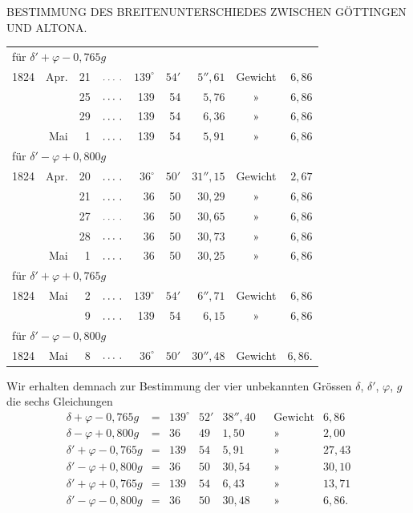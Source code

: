 \clearpage
\noindent{}\parbox[t]{\dimexpr\textwidth-10mm\relax}{\centering\scriptsize BESTIMMUNG DES BREITENUNTERSCHIEDES ZWISCHEN GÖTTINGEN UND ALTONA.}\par
\begin{center}
\begin{tabular}{rrrc rr r c r}
\multicolumn{9}{l}{für $\delta'+\varphi-0{,}765g$}\\
1824&Apr.&21&$\ldots\,\ldotp$&$139^\circ$&$54'$&$5''{,}61$&Gewicht&$6{,}86$\\
&&25&$\ldots\,\ldotp$&139&54&$5{,}76$&»&$6{,}86$\\
&&29&$\ldots\,\ldotp$&139&54&$6{,}36$&»&$6{,}86$\\
&Mai&1&$\ldots\,\ldotp$&139&54&$5{,}91$&»&$6{,}86$\\
\multicolumn{9}{l}{für $\delta'-\varphi+0{,}800g$}\\
1824&Apr.&20&$\ldots\,\ldotp$&$36^\circ$&$50'$&$31''{,}15$&Gewicht&$2{,}67$\\
&&21&$\ldots\,\ldotp$&36&50&$30{,}29$&»&$6{,}86$\\
&&27&$\ldots\,\ldotp$&36&50&$30{,}65$&»&$6{,}86$\\
&&28&$\ldots\,\ldotp$&36&50&$30{,}73$&»&$6{,}86$\\
&Mai&1&$\ldots\,\ldotp$&36&50&$30{,}25$&»&$6{,}86$\\
\multicolumn{9}{l}{für $\delta'+\varphi+0{,}765g$}\\
1824&Mai&2&$\ldots\,\ldotp$&$139^\circ$&$54'$&$6''{,}71$&Gewicht&$6{,}86$\\
&&9&$\ldots\,\ldotp$&139&54&$6{,}15$&»&$6{,}86$\\
\multicolumn{9}{l}{für $\delta'-\varphi-0{,}800g$}\\
1824&Mai&8&$\ldots\,\ldotp$&$36^\circ$&$50'$&$30''{,}48$&Gewicht&$6{,}86$.
\end{tabular}
\end{center}
Wir erhalten demnach zur Bestimmung der vier unbekannten Grössen $\delta$, $\delta'$, $\varphi$, $g$ die sechs Gleichungen
\[
\begin{array}{rclrrrcr}
\delta+\varphi-0{,}765g&=&139^\circ&52'&38''{,}40&&\text{Gewicht}&6{,}86\\
\delta-\varphi+0{,}800g&=&36&49&1{,}50&&\text{»}&2{,}00\\
\delta'+\varphi-0{,}765g&=&139&54&5{,}91&&\text{»}&27{,}43\\
\delta'-\varphi+0{,}800g&=&36&50&30{,}54&&\text{»}&30{,}10\\
\delta'+\varphi+0{,}765g&=&139&54&6{,}43&&\text{»}&13{,}71\\
\delta'-\varphi-0{,}800g&=&36&50&30{,}48&&\text{»}&6{,}86.
\end{array}
\]
